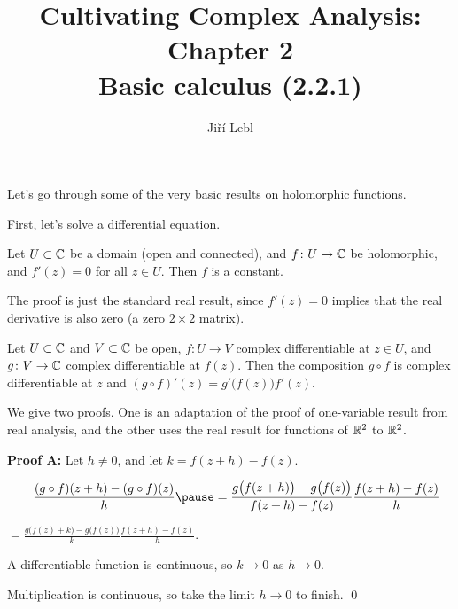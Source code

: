 \documentclass[10pt,aspectratio=169]{beamer}
\author{Ji\v{r}\'i Lebl}
\institute[OSU]{%
Departemento pri Matematiko de Oklahoma {\^S}tata Universitato}
\title{Cultivating Complex Analysis: Chapter 2\\%
Basic calculus (2.2.1)}
\date{}
\begin{document}
\begin{frame}
\titlepage
\end{frame}

\begin{frame}
Let's go through some of the very basic results on holomorphic functions.

\medskip
\pause

First, let's solve a differential equation.

\pause

\begin{proposition}
Let $U \subset {\mathbb{C}}$ be a domain (open and connected),
and $f \colon U \to {\mathbb{C}}$ be holomorphic, and $f'(z) = 0$ for all $z \in U$.
Then $f$ is a constant.
\end{proposition}

\pause

The proof is just the standard real result, since $f'(z)=0$ implies that
the real derivative is also zero (a zero $2 \times 2$ matrix).
\end{frame}

\begin{frame}
\begin{proposition} 
Let $U \subset {\mathbb{C}}$ and $V \subset {\mathbb{C}}$ be open, $f \colon U \to V$
complex differentiable at $z \in U$, and $g \colon V \to {\mathbb{C}}$ complex differentiable
at $f(z)$.  Then the composition $g \circ f$
is complex differentiable at $z$ and $(g \circ f)'(z) = g'\bigl(f(z)\bigr) f'(z)$.
\end{proposition}

\pause

We give two proofs.  One is an adaptation of the proof of one-variable result
from real analysis, and the other uses the real result for functions of ${\mathbb{R}}^2$
to ${\mathbb{R}}^2$.

\medskip
\pause

\textbf{Proof A:}
Let $h \not= 0$, and let $k = f(z+h) -f(z)$.

\medskip
\pause

$\displaystyle
\qquad
\frac{(g \circ f)(z+h) - (g \circ f)(z)}{h}
\pause
 =
\frac{g \bigl( f(z+h) \bigr) - g\bigl( f(z) \bigr)}{f(z+h)-f(z)}
\frac{f(z+h)-f(z)}{h}
$

\pause
\medskip

%
$\displaystyle
=
\frac{g \bigl( f(z) + k \bigr) - g\bigl( f(z) \bigr)}{k}
\frac{f(z+h)-f(z)}{h} .
$

\medskip
\pause

A differentiable function is continuous, so $k \to 0$ as $h \to 0$.
\pause

Multiplication is continuous, so take the limit $h \to 0$ to finish.
\qed

\end{frame}
\end{document}
